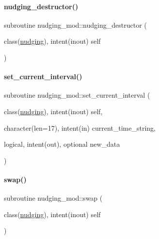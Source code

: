 \paragraph{\texorpdfstring{nudging\+\_\+destructor()}{nudging\_destructor()}}
{\footnotesize\ttfamily subroutine nudging\+\_\+mod\+::nudging\+\_\+destructor (\begin{DoxyParamCaption}\item[{class(\mbox{\hyperlink{structnudging__mod_1_1nudging}{nudging}}), intent(inout)}]{self }\end{DoxyParamCaption})}

\mbox{\label{namespacenudging__mod_a2f7701af532e7c9624c52fb99fae1135}} 
\paragraph{\texorpdfstring{set\+\_\+current\+\_\+interval()}{set\_current\_interval()}}
{\footnotesize\ttfamily subroutine nudging\+\_\+mod\+::set\+\_\+current\+\_\+interval (\begin{DoxyParamCaption}\item[{class(\mbox{\hyperlink{structnudging__mod_1_1nudging}{nudging}}), intent(inout)}]{self,  }\item[{character(len=17), intent(in)}]{current\+\_\+time\+\_\+string,  }\item[{logical, intent(out), optional}]{new\+\_\+data }\end{DoxyParamCaption})\hspace{0.3cm}{\ttfamily [private]}}

\mbox{\label{namespacenudging__mod_a98e83d7bb41ed78b3aecc5191e9d4d6b}} 
\paragraph{\texorpdfstring{swap()}{swap()}}
{\footnotesize\ttfamily subroutine nudging\+\_\+mod\+::swap (\begin{DoxyParamCaption}\item[{class(\mbox{\hyperlink{structnudging__mod_1_1nudging}{nudging}}), intent(inout)}]{self }\end{DoxyParamCaption})\hspace{0.3cm}{\ttfamily [private]}}

